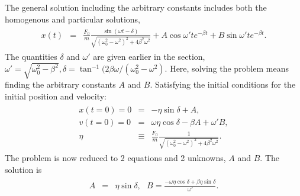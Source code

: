 \documentclass[letterpaper,10pt,english]{sphinxmanual}
\begin{document}
The general solution including the arbitrary constants includes both the homogenous and particular solutions,
\begin{equation*}
\begin{split}
\begin{eqnarray*}
x(t)&=&\frac{F_0}{m}\frac{\sin(\omega t-\delta)}{\sqrt{(\omega_0^2-\omega^2)^2+4\beta^2\omega^2}}
+A\cos\omega't e^{-\beta t}+B\sin\omega't e^{-\beta t}.
\end{eqnarray*}
\end{split}
\end{equation*}
The quantities \(\delta\) and \(\omega'\) are given earlier in the
section, \(\omega'=\sqrt{\omega_0^2-\beta^2},
\delta=\tan^{-1}(2\beta\omega/(\omega_0^2-\omega^2)\). Here, solving
the problem means finding the arbitrary constants \(A\) and
\(B\). Satisfying the initial conditions for the initial position and
velocity:
\begin{equation*}
\begin{split}
\begin{eqnarray*}
x(t=0)=0&=&-\eta\sin\delta+A,\\
v(t=0)=0&=&\omega\eta\cos\delta-\beta A+\omega'B,\\
\eta&\equiv&\frac{F_0}{m}\frac{1}{\sqrt{(\omega_0^2-\omega^2)^2+4\beta^2\omega^2}}.
\end{eqnarray*}
\end{split}
\end{equation*}
The problem is now reduced to 2 equations and 2 unknowns, \(A\) and \(B\). The solution is
\begin{equation*}
\begin{split}
\begin{eqnarray}
A&=& \eta\sin\delta ,~~~B=\frac{-\omega\eta\cos\delta+\beta\eta\sin\delta}{\omega'}.
\end{eqnarray}
\end{split}
\end{equation*}
\end{document}
